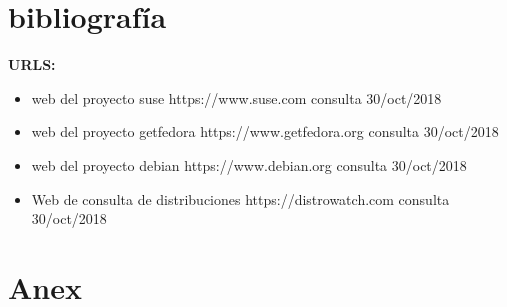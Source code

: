 \documentclass[preprint,11pt]{elsarticle}
\begin{document}
\clearpage
\section{bibliografía}
    \textbf{URLS:}
    \begin{itemize}
        \item web del proyecto suse https://www.suse.com consulta 30/oct/2018
        \item web del proyecto getfedora https://www.getfedora.org consulta 30/oct/2018
        \item web del proyecto debian  https://www.debian.org consulta 30/oct/2018
        \item Web de consulta de distribuciones https://distrowatch.com consulta 30/oct/2018
    \end{itemize}

\clearpage


\section{Anex}
\end{document}
